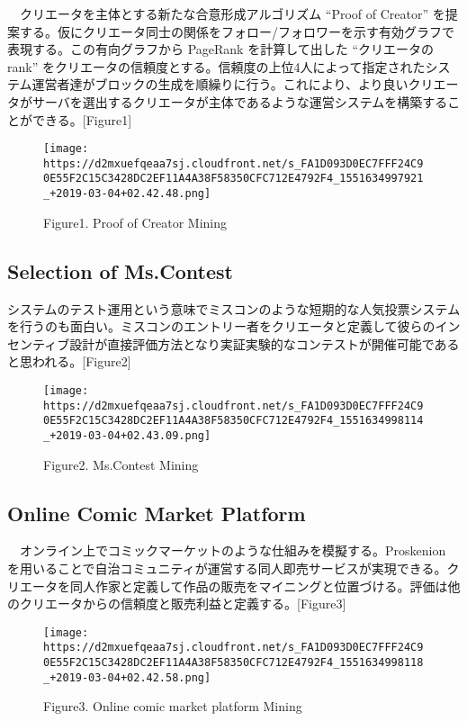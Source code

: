 　クリエータを主体とする新たな合意形成アルゴリズム ``Proof of Creator''
を提案する。仮にクリエータ同士の関係をフォロー/フォロワーを示す有効グラフで表現する。この有向グラフから
PageRank を計算して出した ``クリエータのrank''
をクリエータの信頼度とする。信頼度の上位4人によって指定されたシステム運営者達がブロックの生成を順繰りに行う。これにより、より良いクリエータがサーバを選出するクリエータが主体であるような運営システムを構築することができる。{[}Figure1{]}

\begin{figure}
\centering
\texttt{[image: https://d2mxuefqeaa7sj.cloudfront.net/s\_FA1D093D0EC7FFF24C90E55F2C15C3428DC2EF11A4A38F58350CFC712E4792F4\_1551634997921\_+2019-03-04+02.42.48.png]}
\caption{Figure1. Proof of Creator Mining}
\end{figure}

\hypertarget{selection-of-ms.contest}{%
\subsection{Selection of Ms.Contest}\label{selection-of-ms.contest}}

システムのテスト運用という意味でミスコンのような短期的な人気投票システムを行うのも面白い。ミスコンのエントリー者をクリエータと定義して彼らのインセンティブ設計が直接評価方法となり実証実験的なコンテストが開催可能であると思われる。{[}Figure2{]}

\begin{figure}
\centering
\texttt{[image: https://d2mxuefqeaa7sj.cloudfront.net/s\_FA1D093D0EC7FFF24C90E55F2C15C3428DC2EF11A4A38F58350CFC712E4792F4\_1551634998114\_+2019-03-04+02.43.09.png]}
\caption{Figure2. Ms.Contest Mining}
\end{figure}

\hypertarget{online-comic-market-platform}{%
\subsection{Online Comic Market
Platform}\label{online-comic-market-platform}}

　オンライン上でコミックマーケットのような仕組みを模擬する。Proskenion
を用いることで自治コミュニティが運営する同人即売サービスが実現できる。クリエータを同人作家と定義して作品の販売をマイニングと位置づける。評価は他のクリエータからの信頼度と販売利益と定義する。{[}Figure3{]}

\begin{figure}
\centering
\texttt{[image: https://d2mxuefqeaa7sj.cloudfront.net/s\_FA1D093D0EC7FFF24C90E55F2C15C3428DC2EF11A4A38F58350CFC712E4792F4\_1551634998118\_+2019-03-04+02.42.58.png]}
\caption{Figure3. Online comic market platform Mining}
\end{figure}

